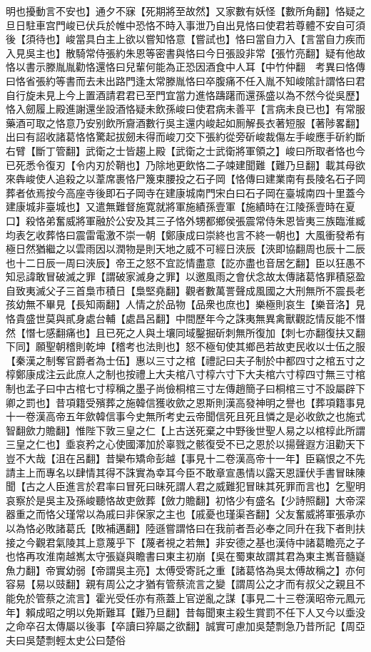 明也擾動言不安也】通夕不寐【死期將至故然】又家數有妖怪【數所角翻】恪疑之旦日駐車宫門峻已伏兵於帷中恐恪不時入事泄乃自出見恪曰使君若尊體不安自可須後【須待也】峻當具白主上欲以嘗知恪意【嘗試也】恪曰當自力入【言當自力疾而入見吳主也】散騎常侍張約朱恩等密書與恪曰今日張設非常【張竹亮翻】疑有他故恪以書示滕胤胤勸恪還恪曰兒輩何能為正恐因酒食中人耳【中竹仲翻　考異曰恪傳曰恪省張約等書而去未出路門逢太常滕胤恪曰卒腹痛不任入胤不知峻隂計謂恪曰君自行旋未見上今上置酒請君君已至門宜當力進恪躊躇而還孫盛以為不然今從吳歷】恪入劒履上殿進謝還坐設酒恪疑未飲孫峻曰使君病未善平【言病未良已也】有常服藥酒可取之恪意乃安别飲所齎酒數行吳主還内峻起如厠解長衣著短服【著陟畧翻】出曰有詔收諸葛恪恪驚起拔劒未得而峻刀交下張約從旁斫峻裁傷左手峻應手斫約斷右臂【斷丁管翻】武衛之士皆趨上殿【武衛之士武衛將軍領之】峻曰所取者恪也今已死悉令復刃【令内刃於鞘也】乃除地更飲恪二子竦建聞難【難乃旦翻】載其母欲來犇峻使人追殺之以葦席裹恪尸篾束腰投之石子岡【恪傳曰建業南有長陵名石子岡葬者依焉按今高座寺後即石子岡寺在建康城南門宋白曰石子岡在臺城南四十里蓋今建康城非臺城也】又遣無難督施寛就將軍施績孫壹軍【施績時在江陵孫壹時在夏口】殺恪弟奮威將軍融於公安及其三子恪外甥都鄉侯張震常侍朱恩皆夷三族臨淮臧均表乞收葬恪曰震雷電激不崇一朝【鄭康成曰崇終也言不終一朝也】大風衝發希有極日然猶繼之以雲雨因以潤物是則天地之威不可經日浹辰【浹即協翻周也辰十二辰也十二日辰一周曰浹辰】帝王之怒不宜訖情盡意【訖亦盡也音居乞翻】臣以狂愚不知忌諱敢冒破滅之罪【謂破家滅身之罪】以邀風雨之會伏念故太傳諸葛恪罪積惡盈自致夷滅父子三首梟市積日【梟堅堯翻】觀者數萬詈聲成風國之大刑無所不震長老孩幼無不畢見【長知兩翻】人情之於品物【品衆也庶也】樂極則哀生【樂音洛】見恪貴盛世莫與貳身處台輔【處昌呂翻】中間歷年今之誅夷無異禽獸觀訖情反能不憯然【憯七感翻痛也】且已死之人與土壤同域鑿掘斫刺無所復加【刺七亦翻復扶又翻下同】願聖朝稽則乾坤【稽考也法則也】怒不極旬使其鄉邑若故吏民收以士伍之服【秦漢之制奪官爵者為士伍】惠以三寸之棺【禮記曰夫子制於中都四寸之棺五寸之椁鄭康成注云此庶人之制也按禮上大夫棺八寸椁六寸下大夫棺六寸椁四寸無三寸棺制也孟子曰中古棺七寸椁稱之墨子尚儉桐棺三寸左傳趙簡子曰桐棺三寸不設屬辟下卿之罰也】昔項籍受殯葬之施韓信獲收歛之恩斯則漢高發神明之譽也【葬項籍事見十一卷漢高帝五年歛韓信事今史無所考史云帝聞信死且死且憐之是必收歛之也施式智翻歛力贍翻】惟陛下敦三皇之仁【上古送死棄之中野後世聖人易之以棺椁此所謂三皇之仁也】埀哀矜之心使國澤加於辜戮之骸復受不已之恩於以揚聲遐方沮勸天下豈不大哉【沮在呂翻】昔欒布矯命彭越【事見十二卷漢高帝十一年】臣竊恨之不先請主上而專名以肆情其得不誅實為幸耳今臣不敢章宣愚情以露天恩謹伏手書冒昧陳聞【古之人臣進言於君率曰冒死曰昧死謂人君之威難犯冒昧其死罪而言也】乞聖明哀察於是吳主及孫峻聽恪故吏斂葬【斂力贍翻】初恪少有盛名【少詩照翻】大帝深器重之而恪父瑾常以為戚曰非保家之主也【戚憂也瑾渠吝翻】父友奮威將軍張承亦以為恪必敗諸葛氏【敗補邁翻】陸遜嘗謂恪曰在我前者吾必奉之同升在我下者則扶接之今觀君氣陵其上意蔑乎下【蔑者視之若無】非安德之基也漢侍中諸葛瞻亮之子也恪再攻淮南越嶲太守張嶷與瞻書曰東主初崩【吳在蜀東故謂其君為東主嶲音髓嶷魚力翻】帝實幼弱【帝謂吳主亮】太傅受寄託之重【諸葛恪為吳太傅故稱之】亦何容易【易以豉翻】親有周公之才猶有管蔡流言之變【謂周公之才而有叔父之親且不能免於管蔡之流言】霍光受任亦有燕蓋上官逆亂之謀【事見二十三卷漢昭帝元鳳元年】賴成昭之明以免斯難耳【難乃旦翻】昔每聞東主殺生賞罰不任下人又今以埀没之命卒召太傳屬以後事【卒讀曰猝屬之欲翻】誠實可慮加吳楚剽急乃昔所記【周亞夫曰吳楚剽輕太史公曰楚俗